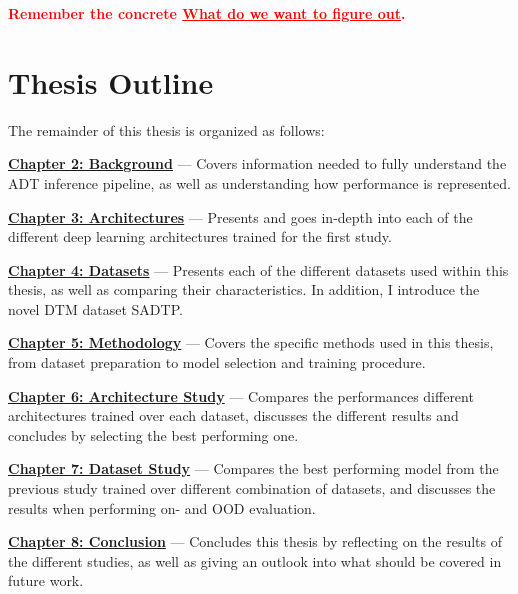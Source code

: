 \textcolor{red}{\textbf{Remember the concrete \underline{What do we want to figure out}.}}

\section{Thesis Outline}

The remainder of this thesis is organized as follows:

\noindent \hyperref[Background]{\textbf{Chapter 2: Background}} — Covers information needed to fully understand the \gls{ADT} inference pipeline, as well as understanding how performance is represented.

\noindent \hyperref[Architectures]{\textbf{Chapter 3: Architectures}} — Presents and goes in-depth into each of the different deep learning architectures trained for the first study.

\noindent \hyperref[Datasets]{\textbf{Chapter 4: Datasets}} — Presents each of the different datasets used within this thesis, as well as comparing their characteristics. In addition, I introduce the novel \gls{DTM} dataset SADTP.

\noindent \hyperref[Methodology]{\textbf{Chapter 5: Methodology}} — Covers the specific methods used in this thesis, from dataset preparation to model selection and training procedure.

\noindent \hyperref[Study1]{\textbf{Chapter 6: Architecture Study}} — Compares the performances different architectures trained over each dataset, discusses the different results and concludes by selecting the best performing one.

\noindent \hyperref[Study2]{\textbf{Chapter 7: Dataset Study}} — Compares the best performing model from the previous study trained over different combination of datasets, and discusses the results when performing on- and \gls{OOD} evaluation.

\noindent \hyperref[Conclusion]{\textbf{Chapter 8: Conclusion}} — Concludes this thesis by reflecting on the results of the different studies, as well as giving an outlook into what should be covered in future work.